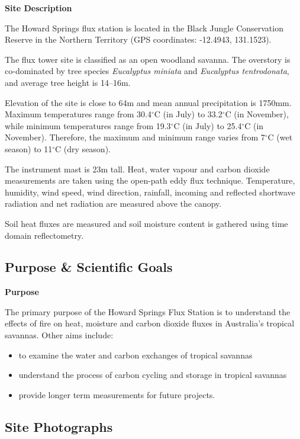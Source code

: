 \documentclass[11pt,a4paper]{article}
\begin{document}
\textbf{Site Description}

The Howard Springs flux station is located in the Black Jungle Conservation Reserve in the Northern Territory (GPS coordinates: -12.4943, 131.1523).

The flux tower site is classified as an open woodland savanna. The overstory is co-dominated by tree species \textit{Eucalyptus miniata} and \textit{Eucalyptus tentrodonata}, and average tree height is 14–16m.

Elevation of the site is close to 64m and mean annual precipitation is 1750mm. Maximum temperatures range from 30.4$^\circ$C (in July) to 33.2$^\circ$C (in November), while minimum temperatures range from 19.3$^\circ$C (in July) to 25.4$^\circ$C (in November). Therefore, the maximum and minimum range varies from 7$^\circ$C (wet season) to 11$^\circ$C (dry season).

The instrument mast is 23m tall. Heat, water vapour and carbon dioxide measurements are taken using the open-path eddy flux technique. Temperature, humidity, wind speed, wind direction, rainfall, incoming and reflected shortwave radiation and net radiation are measured above the canopy.

Soil heat fluxes are measured and soil moisture content is gathered using time domain reflectometry.

\subsection*{Purpose \& Scientific Goals}

\textbf{Purpose}

The primary purpose of the Howard Springs Flux Station is to understand the effects of fire on heat, moisture and carbon dioxide fluxes in Australia's tropical savannas. Other aims include:

\begin{itemize}
  \item to examine the water and carbon exchanges of tropical savannas
  \item understand the process of carbon cycling and storage in tropical savannas
  \item provide longer term measurements for future projects.
\end{itemize}

\subsection*{Site Photographs}
\end{document}
